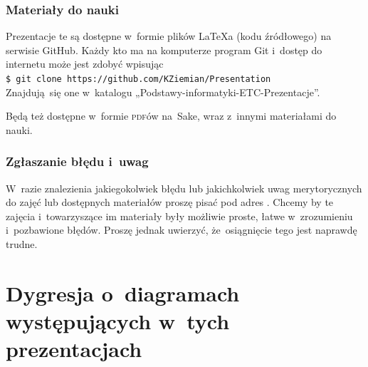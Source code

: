 \documentclass[10pt,t]{beamer}
\begin{document}
\begin{frame}
  \frametitle{Materiały do nauki}


  Prezentacje te są dostępne w~formie plików \LaTeX a (kodu źródłowego)
  na serwisie GitHub. Każdy kto ma na komputerze program Git i~dostęp
  do internetu może jest zdobyć wpisując \\
  \texttt{\$ git clone https://github.com/KZiemian/Presentation} \\
  Znajdują~się one w~katalogu „Podstawy-informatyki-ETC-Prezentacje”.

  Będą też dostępne w~formie \textsc{pdf}ów na~Sake, wraz z~innymi
  materiałami do nauki.

\end{frame}





\begin{frame}
  \frametitle{Zgłaszanie błędu i~uwag}


  W~razie znalezienia jakiegokolwiek błędu lub jakichkolwiek uwag
  merytorycznych do zajęć lub dostępnych materiałów proszę pisać pod adres
  \email. Chcemy by te zajęcia i~towarzyszące im materiały były możliwie
  proste, łatwe w~zrozumieniu i~pozbawione błędów. Proszę jednak uwierzyć,
  że~osiągnięcie tego jest naprawdę trudne.

\end{frame}










\section{Dygresja o~diagramach występujących w~tych
  prezentacjach}
\end{document}
